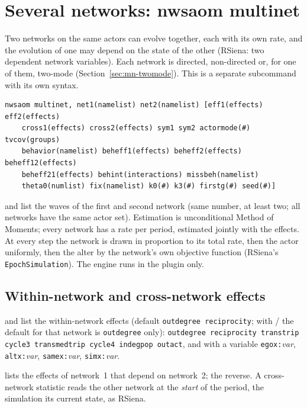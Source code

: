 \section{Several networks: nwsaom multinet}\label{sec:multinet}

Two networks on the same actors can evolve together, each with its own rate, and the evolution of one may depend on the state of the other (RSiena: two dependent network variables). Each network is directed, non-directed or, for one of them, two-mode (Section~\ref{sec:mn-twomode}). This is a separate subcommand with its own syntax.

\begin{lstlisting}
nwsaom multinet, net1(namelist) net2(namelist) [eff1(effects) eff2(effects)
    cross1(effects) cross2(effects) sym1 sym2 actormode(#) tvcov(groups)
    behavior(namelist) beheff1(effects) beheff2(effects) beheff12(effects)
    beheff21(effects) behint(interactions) missbeh(namelist)
    theta0(numlist) fix(namelist) k0(#) k3(#) firstg(#) seed(#)]
\end{lstlisting}

 and  list the waves of the first and second network (same number, at least two; all networks have the same actor set). Estimation is unconditional Method of Moments; every network has a rate per period, estimated jointly with the effects. At every step the network is drawn in proportion to its total rate, then the actor uniformly, then the alter by the network's own objective function (RSiena's \texttt{EpochSimulation}). The engine runs in the plugin only.

\subsection{Within-network and cross-network effects}

 and  list the within-network effects (default \texttt{outdegree reciprocity}; with / the default for that network is \texttt{outdegree} only): \texttt{outdegree reciprocity transtrip cycle3 transmedtrip cycle4 indegpop outact}, and with a variable \texttt{egox:}\emph{var}, \texttt{altx:}\emph{var}, \texttt{samex:}\emph{var}, \texttt{simx:}\emph{var}.

 lists the effects of network~1 that depend on network~2;  the reverse. A cross-network statistic reads the other network at the \emph{start} of the period, the simulation its current state, as RSiena.

